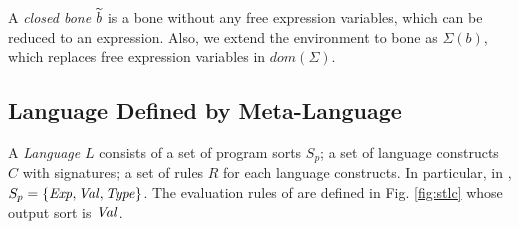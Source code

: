 
A \textit{closed bone} $\widetilde{b}$ is a bone without any free expression variables,
 which can be reduced to an expression.
Also, we extend the environment to bone as $Σ(b)$, which replaces free expression variables in $dom(Σ)$.


\subsection{Language Defined by Meta-Language}
A \textit{Language} $L$ consists of a set of program sorts $S_p$;
 a set of language constructs $C$ with signatures;
 a set of rules $R$ for each language constructs.
In particular, in \STLC{}, $S_p=\{\mathit{Exp},\mathit{Val},\mathit{Type}\}$.
The evaluation rules of \STLC{} are defined in Fig. \ref{fig:stlc} whose output sort is $\mathit{Val}$.

